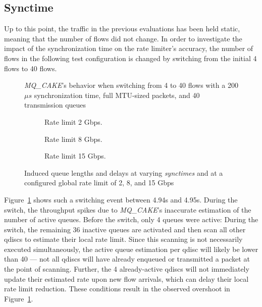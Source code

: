 \subsection{Synctime}\label{sec:synchronization-time}
Up to this point, the traffic in the previous evaluations has been held static, meaning that the number of flows did not change.
%
In order to investigate the impact of the synchronization time on the rate limiter's accuracy, the number of flows in the following test configuration is changed by switching from the  initial 4 flows to 40 flows.
%
\begin{figure}
    \centering
    
    \caption{\textit{MQ\_CAKE}'s behavior when switching from 4 to 40 flows with a 200$\mu s$ synchronization time, full MTU-sized packets, and 40 transmission queues}\label{fig:switching_200us}
\end{figure}
%
\begin{figure*}
    \begin{subfigure}{0.3\linewidth}
        \centering
        
        \caption{Rate limit 2 Gbps.}\label{fig:qlen_qdel_200us_2}
    \end{subfigure}
    \hfill
    \begin{subfigure}{0.3\linewidth}
        \centering
        
        \caption{Rate limit 8 Gbps.}\label{fig:qlen_qdel_200us_8}
    \end{subfigure}
    \hfill
    \begin{subfigure}{0.3\linewidth}
        \centering
        
        \caption{Rate limit 15 Gbps.}\label{fig:qlen_qdel_200us_15}
    \end{subfigure}
    \caption{Induced queue lengths and delays at varying \textit{synctimes} and at a configured global rate limit of 2, 8, and 15 Gbps}\label{fig:qlen_qdel}
\end{figure*}

Figure~\ref{fig:switching_200us} shows such a switching event between 4.94s and 4.95s.
%
During the switch, the throughput spikes due to \textit{MQ\_CAKE}'s inaccurate estimation of the number of active queues.
%
Before the switch, only 4 queues were active: During the switch, the remaining 36 inactive queues are activated and then scan all other qdiscs to estimate their local rate limit.
%
Since this scanning is not necessarily executed simultaneously, the active queue estimation per qdisc will likely be lower than 40 --- not all qdiscs will have already enqueued or transmitted a packet at the point of scanning.
%
Further, the 4 already-active qdiscs will not immediately update their estimated rate upon new flow arrivals, which can delay their local rate limit reduction.
%
These conditions result in the observed overshoot in Figure~\ref{fig:switching_200us}.
%

